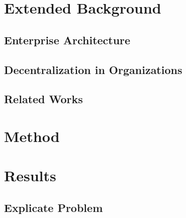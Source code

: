 \documentclass[12pt,
               a4,
               twoside,
               openright]{book} %
\begin{document}
    
    \chapter{Extended Background}
    \label{chap:extendedBackgrounf}
    
    \section{Enterprise Architecture}
    \label{sec:ea}
    
    
    \section{Decentralization in Organizations}
    \label{sec:organizations}
       
    
    \section{Related Works}
    \label{sec:related}
    
    
    
    \chapter{Method}
    \label{chap:method}
    
    
    
    \chapter{Results}
    \label{chap:results}  
    
    \section{Explicate Problem}    
    \label{sec:problem}


    
\end{document}
